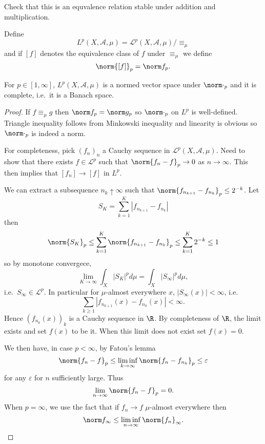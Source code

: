 \documentclass[a4paper]{article}
\begin{document}
Check that this is an equvalence relation stable under addition and multiplication.

\begin{definition}[\(L^p\)-space]
  Define
  \[
    L^p(X, \mathcal A, \mu) = \mathcal L^p(X, \mathcal A, \mu) / \equiv_\mu
  \]
  and if \([f]\) denotes the equivalence class of \(f\) under \(\equiv_\mu\) we define
  \[
    \norm{[f]}_p = \norm f_p.
  \]
\end{definition}

\begin{proposition}
  For \(p \in [1, \infty]\), \(L^p(X, \mathcal A, \mu)\) is a normed vector space under \(\norm \cdot_p\) and it is complete, i.e.\ it is a Banach space.
\end{proposition}

\begin{proof}
  If \(f \equiv_\mu g\) then \(\norm f_p = \norm g_p\) so \(\norm \cdot_p\) on \(L^p\) is well-defined. Triangle inequality follows from Minkowski inequality and linearity is obvious so \(\norm \cdot_p\) is indeed a norm.

  For completeness, pick \((f_n)_n\) a Cauchy sequence in \(\mathcal L^p(X, \mathcal A, \mu)\). Need to show that there exists \(f \in \mathcal L^p\) such that \(\norm{f_n - f}_p \to 0\) as \(n \to \infty\). This then implies that \([f_n] \to [f]\) in \(L^p\).

  We can extract a subsequence \(n_k \uparrow \infty\) such that \(\norm{f_{n_{k + 1}} - f_{n_k}}_p \leq 2^{-k}\). Let
  \[
    S_K = \sum_{k = 1}^K |f_{n_{k + 1}} - f_{n_k}|
  \]
  then
  \[
    \norm{S_K}_p
    \leq \sum_{k = 1}^K \norm{f_{n_{k + 1}} - f_{n_k}}_p
    \leq \sum_{k = 1}^K 2^{-k}
    \leq 1
  \]
  so by monotone convergece,
  \[
    \lim_{K \to \infty} \int_X |S_K|^p d\mu = \int_X |S_\infty|^p d\mu,
  \]
  i.e.\ \(S_\infty \in \mathcal L^p\). In particular for \(\mu\)-almost everywhere \(x\), \(|S_\infty(x)| < \infty\), i.e.
  \[
    \sum_{k \geq 1} |f_{n_{k + 1}}(x) - f_{n_k}(x)| < \infty.
  \]
  Hence \((f_{n_k}(x))_k\) is a Cauchy sequence in \(\R\). By completeness of \(\R\), the limit exists and set \(f(x)\) to be it. When this limit does not exist set \(f(x) = 0\).

  We then have, in case \(p < \infty\), by Fatou's lemma
  \[
    \norm{f_n - f}_p \leq \liminf_{k \to \infty} \norm{f_n - f_{n_k}}_p \leq \varepsilon
  \]
  for any \(\varepsilon\) for \(n\) sufficiently large. Thus
  \[
    \lim_{n \to \infty} \norm{f_n - f}_p = 0.
  \]
  When \(p = \infty\), we use the fact that if \(f_n \to f\) \(\mu\)-almost everywhere then
  \[
    \norm f_\infty \leq \liminf_{n \to \infty} \norm{f_n}_\infty.
  \]


\end{proof}
\end{document}

